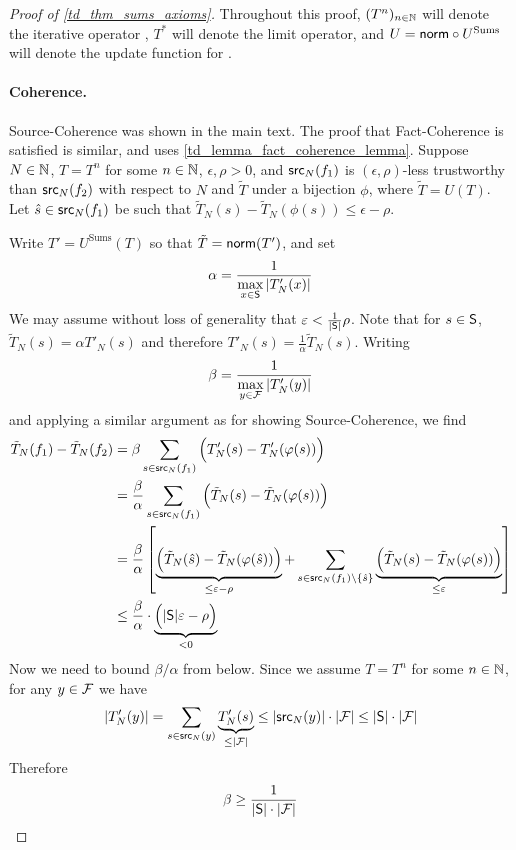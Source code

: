 \begin{proof}[Proof of \cref{td_thm_sums_axioms}]

Throughout this proof, $(T^n)_{n \in \Nat}$ will denote the iterative operator
\sums{}, $T^*$ will denote the limit operator, and $U = \norm \circ
U^{\text{Sums}}$ will denote the update function for \sums{}.

\paragraph{Coherence.} Source-Coherence was shown in the main text.
The proof that Fact-Coherence is satisfied is similar, and uses
\cref{td_lemma_fact_coherence_lemma}. Suppose $N \in \N$, $T = T^n$ for some $n
\in \Nat$, $\epsilon, \rho > 0$, and $\src_N(f_1)$ is $(\epsilon, \rho)$-less
trustworthy than $\src_N(f_2)$ with respect to $N$ and $\tilde{T}$ under a
bijection $\phi$, where $\tilde{T} = U(T)$. Let $\hat{s} \in \src_N(f_1)$ be
such that $\tilde{T}_N(s) - \tilde{T}_N(\phi(s)) \le \epsilon - \rho$.

Write $T' = U^{\text{Sums}}(T)$ so that $\tilde{T} = \norm(T')$, and set
\[
    \alpha = \frac{1}{\max\limits_{x \in \S}{|T'_N(x)|}}
\]
We may assume without loss of generality that $\epsilon < \frac{1}{|\S|}\rho$.
Note that for $s \in \S$, $\tilde{T}_N(s) = {\alpha}T'_N(s)$ and therefore
$T'_N(s) = \frac{1}{\alpha}\tilde{T}_N(s)$. Writing
\[
    \beta = \frac{1}{\max\limits_{y \in \F}{|T'_N(y)|}}
\]
and applying a similar argument as for showing Source-Coherence, we find
\begin{align*}
    \tilde{T}_N(f_1) - \tilde{T}_N(f_2)
    &= \beta \sum_{s \in \src_N(f_1)}{ \Big(
        T'_N(s) - T'_N(\phi(s))
    \Big) } \\
    &= \frac{\beta}{\alpha} \sum_{s \in \src_N(f_1)}{ \Big(
        \tilde{T}_N(s) - \tilde{T}_N(\phi(s))
    \Big) } \\
    &= \frac{\beta}{\alpha} \left[
        \underbrace{
            \Big(
                \tilde{T}_N(\hat{s}) - \tilde{T}_N(\phi(\hat{s}))
            \Big)
        }_{\le \epsilon - \rho}
        +
        \sum_{s \in \src_N(f_1) \setminus \{\hat{s}\} }{
            \underbrace{
                \Big(
                    \tilde{T}_N(s) - \tilde{T}_N(\phi(s))
                \Big)
            }_{\le \epsilon}
        }
    \right] \\
    & \le \frac{\beta}{\alpha}
      \cdot
      \underbrace{
          \Big(|\S|\epsilon - \rho \Big)
      }_{< 0}
\end{align*}
Now we need to bound $\beta / \alpha$ from below. Since we assume $T =
T^n$ for some $n \in \Nat$, for any $y \in \F$ we have
\[
    |T'_N(y)| =
        \sum_{s \in \src_N(y)}{
            \underbrace{T'_N(s)}_{\le |\F|}
        }
    \le |\src_N(y)| \cdot |\F|
    \le |\S| \cdot |\F|
\]
Therefore
\[
    \beta \ge \frac{1}{|\S| \cdot |\F|}
\]


\end{proof}
